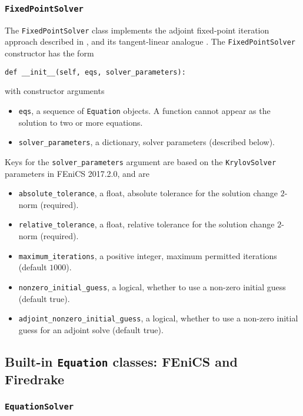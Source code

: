 \documentclass[11pt]{article}
\begin{document}
\subsubsection{\texttt{FixedPointSolver}}

The \texttt{FixedPointSolver} class implements the adjoint fixed-point
iteration approach described in \citet{christianson1994}, and its
tangent-linear analogue \citep{gilbert1992}. The \texttt{FixedPointSolver}
constructor has the form
\begin{lstlisting}
def __init__(self, eqs, solver_parameters):
\end{lstlisting}
with constructor arguments
\begin{itemize}
  \item \texttt{eqs}, a sequence of \texttt{Equation} objects. A function
    cannot appear as the solution to two or more equations.
  \item \texttt{solver\_parameters}, a dictionary, solver parameters (described
    below).
\end{itemize}
Keys for the \texttt{solver\_parameters} argument are based on the
\texttt{KrylovSolver} parameters in FEniCS 2017.2.0, and are
\begin{itemize}
  \item \texttt{absolute\_tolerance}, a float, absolute tolerance for the
    solution change $2$-norm (required).
  \item \texttt{relative\_tolerance}, a float, relative tolerance for the
    solution change $2$-norm (required).
  \item \texttt{maximum\_iterations}, a positive integer, maximum permitted
    iterations (default $1000$).
  \item \texttt{nonzero\_initial\_guess}, a logical, whether to use a non-zero
    initial guess (default true).
  \item \texttt{adjoint\_nonzero\_initial\_guess}, a logical, whether to use a
    non-zero initial guess for an adjoint solve (default true).
\end{itemize}

\subsection{Built-in \texttt{Equation} classes: FEniCS and Firedrake}

\subsubsection{\texttt{EquationSolver}}\label{sect:EquationSolver}
\end{document}
